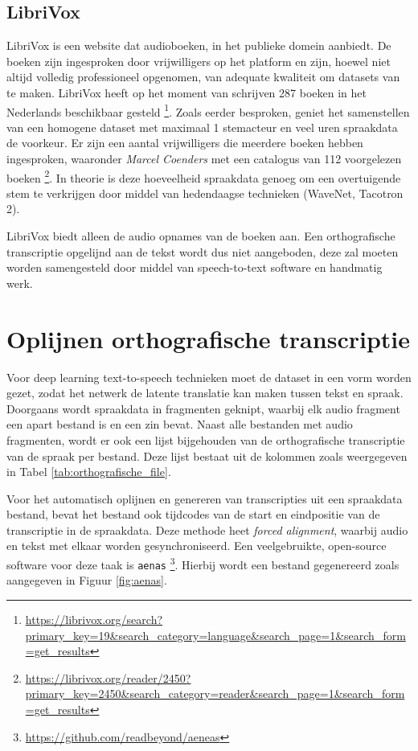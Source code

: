 \subsection{LibriVox}
LibriVox is een website dat audioboeken, in het publieke domein aanbiedt. De boeken zijn ingesproken door vrijwilligers op het platform en zijn, hoewel niet altijd volledig professioneel opgenomen, van adequate kwaliteit om datasets van te maken. LibriVox heeft op het moment van schrijven 287 boeken in het Nederlands beschikbaar gesteld \footnote{\url{https://librivox.org/search?primary_key=19&search_category=language&search_page=1&search_form=get_results}}. Zoals eerder besproken, geniet het samenstellen van een homogene dataset met maximaal 1 stemacteur en veel uren spraakdata de voorkeur. Er zijn een aantal vrijwilligers die meerdere boeken hebben ingesproken, waaronder \textit{Marcel Coenders} met een catalogus van 112 voorgelezen boeken \footnote{\url{https://librivox.org/reader/2450?primary_key=2450&search_category=reader&search_page=1&search_form=get_results}}. In theorie is deze hoeveelheid spraakdata genoeg om een overtuigende stem te verkrijgen door middel van hedendaagse technieken (WaveNet, Tacotron 2).

LibriVox biedt alleen de audio opnames van de boeken aan. Een orthografische transcriptie opgelijnd aan de tekst wordt dus niet aangeboden, deze zal moeten worden samengesteld door middel van speech-to-text software en handmatig werk.


\section{Oplijnen orthografische transcriptie}
Voor deep learning text-to-speech technieken moet de dataset in een vorm worden gezet, zodat het netwerk de latente translatie kan maken tussen tekst en spraak. Doorgaans wordt spraakdata in fragmenten geknipt, waarbij elk audio fragment een apart bestand is en een zin bevat. Naast alle bestanden met audio fragmenten, wordt er ook een lijst bijgehouden van de orthografische transcriptie van de spraak per bestand. Deze lijst bestaat uit de kolommen zoals weergegeven in Tabel \ref{tab:orthografische_file}.

Voor het automatisch oplijnen en genereren van transcripties uit een spraakdata bestand, bevat het bestand ook tijdcodes van de start en eindpositie van de transcriptie in de spraakdata. Deze methode heet \textit{forced alignment}, waarbij audio en tekst met elkaar worden gesynchroniseerd. Een veelgebruikte, open-source software voor deze taak is \texttt{aenas} \footnote{\url{https://github.com/readbeyond/aeneas}}. Hierbij wordt een bestand gegenereerd zoals aangegeven in Figuur \ref{fig:aenas}. 

